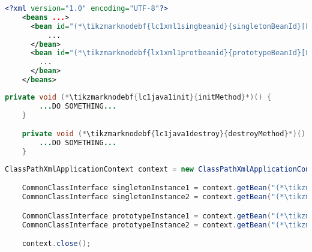 \example
\begin{lstlisting}[language=XML, title={Configuration XML}]
    <?xml version="1.0" encoding="UTF-8"?>
    <beans ...>
      <bean id="(*\tikzmarknodebf{lc1xml1singbeanid}{singletonBeanId}[ForestGreen]*)" class="somepackage.subpackage.CommonClass" init-method="(*\tikzmarknodebf{lc1xml1singinit}{initMethod}[ForestGreen]*)" destroy-method="(*\tikzmarknodebf{lc1xml1singdestroy}{destroyMethod}[ForestGreen]*)">
          ...
      </bean>
      <bean id="(*\tikzmarknodebf{lx1xml1protbeanid}{prototypeBeanId}[ForestGreen]*)" class="somepackage.subpackage.CommonClass" scope="prototype" init-method="(*\tikzmarknodebf{lc1xml1protinit}{initMethod}[ForestGreen]*)" destroy-method="(*\tikzmarknodebf{lc1xml1protdestroy}{destroyMethod}[ForestGreen]*)">
        ...
      </bean>
    </beans>
\end{lstlisting}
\begin{lstlisting}[language=Java, title={Common class for singleton and prototype beans}]
    private void (*\tikzmarknodebf{lc1java1init}{initMethod}*)() {
        ...DO SOMETHING...
    }

    private void (*\tikzmarknodebf{lc1java1destroy}{destroyMethod}*)() {
        ...DO SOMETHING...
    }
\end{lstlisting}
\begin{lstlisting}[language=Java, title={Usage}]
    ClassPathXmlApplicationContext context = new ClassPathXmlApplicationContext("configurationFile.xml");

    CommonClassInterface singletonInstance1 = context.getBean("(*\tikzmarknodebf{lc1java1singbeanid1}{singletonBeanId}[ForestGreen]*)", CommonClassInterface.class);
    CommonClassInterface singletonInstance2 = context.getBean("(*\tikzmarknodebf{lc1java1singbeanid2}{singletonBeanId}[ForestGreen]*)", CommonClassInterface.class);

    CommonClassInterface prototypeInstance1 = context.getBean("(*\tikzmarknodebf{lc1java1protbeanid1}{prototypeBeanId}[ForestGreen]*)", CommonClassInterface.class);
    CommonClassInterface prototypeInstance2 = context.getBean("(*\tikzmarknodebf{lc1java1protbeanid2}{prototypeBeanId}[ForestGreen]*)", CommonClassInterface.class);

    context.close();
\end{lstlisting}


